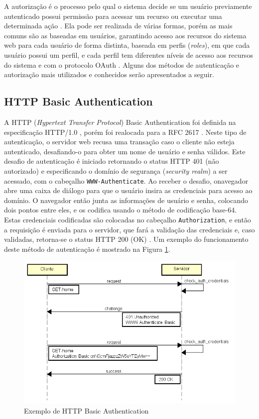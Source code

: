 \documentclass[12pt]{article}
\begin{document}
A autorização é o processo pelo qual o sistema decide se um usuário previamente autenticado
possui permissão para acessar um recurso ou executar uma determinada ação \cite{SPILCA2020}. Ela 
pode ser realizada de várias formas, porém as mais comuns são as baseadas em usuários, garantindo 
acesso aos recursos do sistema web para cada usuário de forma distinta, baseada em perfis 
(\emph{roles}), em que cada usuário possui um perfil, e cada perfil tem diferentes níveis de acesso 
aos recursos do sistema e com o protocolo OAuth \cite{CHAPMAN2012}. Alguns dos métodos de 
autenticação e autorização mais utilizados e conhecidos serão apresentados a seguir.


\subsection{HTTP Basic Authentication}

A HTTP (\emph{Hypertext Transfer Protocol}) Basic Authentication foi definida na especificação
HTTP/1.0 \cite{RFC1945}, porém foi realocada para a RFC 2617 \cite{RFC2617}. Neste tipo de
autenticação, o servidor web recusa uma transação caso o cliente não esteja autenticado,
desafiando-o para obter um nome de usuário e senha válidos. Este desafio de autenticação é iniciado
retornando o status HTTP 401 (não autorizado) e especificando o domínio de segurança
(\emph{security realm}) a ser acessado, com o cabeçalho \texttt{WWW-Authenticate}. Ao receber o 
desafio, onavegador abre uma caixa de diálogo para que o usuário insira as credenciais para acesso 
ao domínio. O navegador então junta as informações de usuário e senha, colocando dois pontos entre 
eles, e os codifica usando o método de codificação base-64. Estas credenciais codificadas são 
colocadas no cabeçalho \texttt{Authorization}, e então a requisição é enviada para o servidor, que 
fará a validação das credenciais e, caso validadas, retorna-se o status HTTP 200 (OK) 
\cite{GOURLEY2002}. Um exemplo do funcionamento deste método de autenticação é mostrado na Figura 
\ref{fig:basicAuth}.

\begin{figure}[ht]
  \centering
  \includegraphics[width=.8\textwidth]{Basic Authentication.png}
  \caption{Exemplo de HTTP Basic Authentication}
  \label{fig:basicAuth}
\end{figure}
\end{document}

